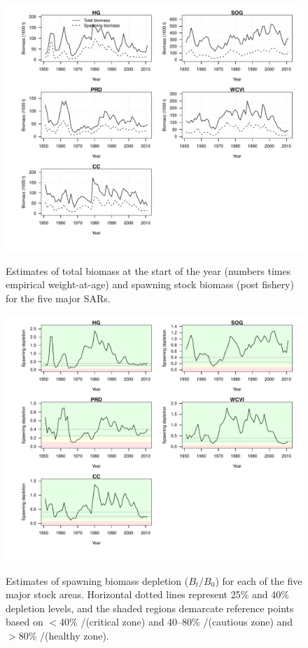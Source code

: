\begin{figure}[!tbp]
	\includegraphics[width=\textwidth]{../FIGS/qPriorFigs/iscam_fig_biomass.pdf}\\
	\caption{Estimates of total biomass at the start of the year (numbers times empirical weight-at-age) and spawning stock biomass (post fishery) for the five major SARs.}\label{PartII:Results:figBiomass}
\end{figure}


\begin{figure}[!tbp]
	\includegraphics[width=\textwidth]{../FIGS/qPriorFigs/iscam_fig_depletion.pdf}\\
	\caption{Estimates of spawning biomass depletion ($B_t/B_0$) for each of the five major stock areas.  Horizontal dotted lines represent 25\% and 40\% depletion levels, and the shaded regions demarcate reference points based on $<$40\% \bmsy/\bo (critical zone) and 40--80\% \bmsy/\bo(cautious zone) and $>$80\% \bmsy/\bo (healthy zone).}\label{PartII:Results:figDepletion}
\end{figure}





